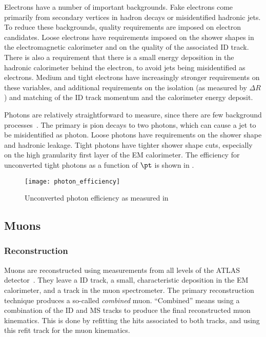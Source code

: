 Electrons have a number of important backgrounds.
Fake electrons come primarily from secondary vertices in hadron decays or misidentified hadronic jets.
To reduce these backgrounds, quality requirements are imposed on electron candidates.
Loose electrons have requirements imposed on the shower shapes in the electromagnetic calorimeter and on the quality of the associated ID track.
There is also a requirement that there is a small energy deposition in the hadronic calorimeter behind the electron, to avoid jets being misidentified as electrons.
Medium and tight electrons have increasingly stronger requirements on these variables, and additional requirements on the isolation (as measured by $\Delta R$) and matching of the ID track momentum and the calorimeter energy deposit.

Photons are relatively straightforward to measure, since there are few background processes~\cite{ATL-PHYS-PUB-2016-015}.
The primary is pion decays to two photons, which can cause a jet to be misidentified as photon.
Loose photons have requirements on the shower shape and hadronic leakage.
Tight photons have tighter shower shape cuts, especially on the high granularity first layer of the EM calorimeter.
The efficiency for unconverted tight photons as a function of $\pt$ is shown in .
\begin{figure}
\caption{Unconverted photon efficiency as measured in~\cite{ATL-PHYS-PUB-2016-015}} \label{fig:photon_eff}
\texttt{[image: photon\_efficiency]}
\end{figure}

\subsection{Muons}

\subsubsection{Reconstruction}

Muons are reconstructed using measurements from all levels of the ATLAS detector~\cite{PERF-2015-10}.
They leave a ID track, a small, characteristic deposition in the EM calorimeter, and a track in the muon spectrometer.
The primary reconstruction technique produces a so-called \textit{combined} muon.
``Combined'' means using a combination of the ID and MS tracks to produce the final reconstructed muon kinematics.
This is done by refitting the hits associated to both tracks, and using this refit track for the muon kinematics.

